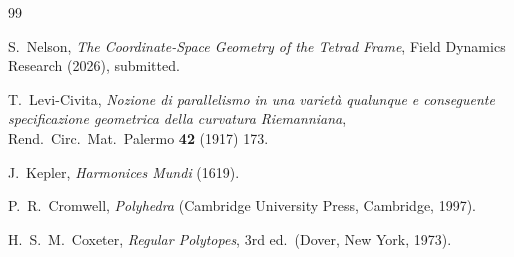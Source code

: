 \documentclass[twocolumn]{iopjournal}
\theoremstyle{definition}
\begin{document}

\begin{thebibliography}{99}

S.~Nelson,
\textit{The Coordinate-Space Geometry of the Tetrad Frame},
Field Dynamics Research (2026), submitted.

T.~Levi-Civita,
\textit{Nozione di parallelismo in una variet\`{a} qualunque e
conseguente specificazione geometrica della curvatura Riemanniana},
Rend.\ Circ.\ Mat.\ Palermo \textbf{42} (1917) 173.

J.~Kepler,
\textit{Harmonices Mundi} (1619).

P.~R.~Cromwell,
\textit{Polyhedra}
(Cambridge University Press, Cambridge, 1997).

H.~S.~M.~Coxeter,
\textit{Regular Polytopes},
3rd ed.\ (Dover, New York, 1973).

\end{thebibliography}
\end{document}

